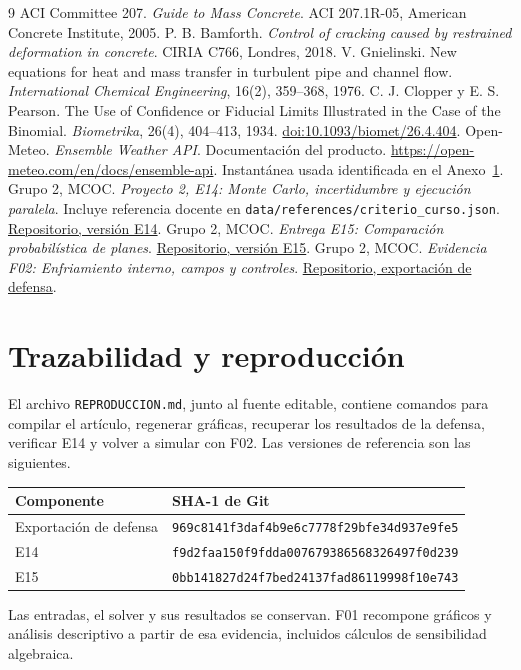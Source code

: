 \documentclass[11pt,a4paper]{article}
\newcommand{\plan}[1]{\texttt{#1}}
\begin{document}
\begin{thebibliography}{9}
 ACI Committee 207. \emph{Guide to Mass Concrete}. ACI 207.1R-05, American Concrete Institute, 2005.
 P. B. Bamforth. \emph{Control of cracking caused by restrained deformation in concrete}. CIRIA C766, Londres, 2018.
 V. Gnielinski. New equations for heat and mass transfer in turbulent pipe and channel flow. \emph{International Chemical Engineering}, 16(2), 359--368, 1976.
 C. J. Clopper y E. S. Pearson. The Use of Confidence or Fiducial Limits Illustrated in the Case of the Binomial. \emph{Biometrika}, 26(4), 404--413, 1934. \href{https://doi.org/10.1093/biomet/26.4.404}{doi:10.1093/biomet/26.4.404}.
 Open-Meteo. \emph{Ensemble Weather API}. Documentación del producto. \url{https://open-meteo.com/en/docs/ensemble-api}. Instantánea usada identificada en el Anexo~\ref{app:repro}.
 Grupo 2, MCOC. \emph{Proyecto 2, E14: Monte Carlo, incertidumbre y ejecución paralela}. Incluye referencia docente en \plan{data/references/criterio\_curso.json}. \href{https://github.com/amvaras/Proyecto-2-MCOC/tree/f9d2faa150f9fdda007679386568326497f0d239/P2_E14}{Repositorio, versión E14}.
 Grupo 2, MCOC. \emph{Entrega E15: Comparación probabilística de planes}. \href{https://github.com/amvaras/Proyecto-2-MCOC/blob/0bb141827d24f7bed24137fad86119998f10e743/P2_E15/Entrega_E15_MCOC.md}{Repositorio, versión E15}.
 Grupo 2, MCOC. \emph{Evidencia F02: Enfriamiento interno, campos y controles}. \href{https://github.com/amvaras/Proyecto-2-MCOC/tree/969c8141f3daf4b9e6c7778f29bfe34d937e9fe5/P2_E14}{Repositorio, exportación de defensa}.
\end{thebibliography}
\clearpage
\appendix
\section{Trazabilidad y reproducción}\label{app:repro}
El archivo \plan{REPRODUCCION.md}, junto al fuente editable, contiene comandos para compilar el artículo, regenerar gráficas, recuperar los resultados de la defensa, verificar E14 y volver a simular con F02. Las versiones de referencia son las siguientes.
\begin{center}\small
\begin{tabular}{@{}ll@{}}
\toprule
Componente & SHA-1 de Git \\
\midrule
Exportación de defensa & \texttt{969c8141f3daf4b9e6c7778f29bfe34d937e9fe5} \\
E14 & \texttt{f9d2faa150f9fdda007679386568326497f0d239} \\
E15 & \texttt{0bb141827d24f7bed24137fad86119998f10e743} \\
\bottomrule
\end{tabular}
\end{center}
Las entradas, el solver y sus resultados se conservan. F01 recompone gráficos y análisis descriptivo a partir de esa evidencia, incluidos cálculos de sensibilidad algebraica.
\end{document}
